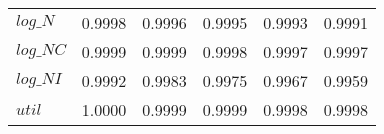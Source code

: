 \begin{center}
\begin{longtable}{lccccc}
$log\_N          $	 & 	     0.9998	 & 	     0.9996	 & 	     0.9995	 & 	     0.9993	 & 	     0.9991 \\ 
$log\_NC         $	 & 	     0.9999	 & 	     0.9999	 & 	     0.9998	 & 	     0.9997	 & 	     0.9997 \\ 
$log\_NI         $	 & 	     0.9992	 & 	     0.9983	 & 	     0.9975	 & 	     0.9967	 & 	     0.9959 \\ 
${util}          $	 & 	     1.0000	 & 	     0.9999	 & 	     0.9999	 & 	     0.9998	 & 	     0.9998 \\ 
\end{longtable}
 \end{center}
